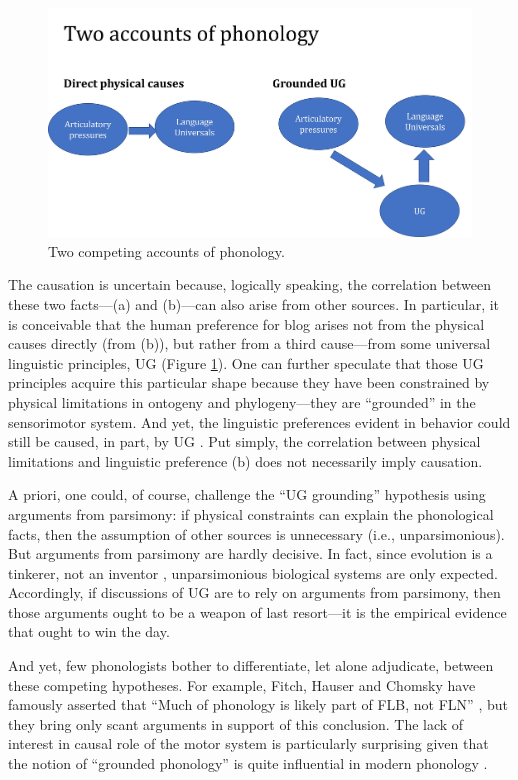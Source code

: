 \documentclass[output=paper,colorlinks,citecolor=brown
]{langscibook}
\begin{document}
\begin{figure}
    \centering
    \includegraphics[width=\textwidth,keepaspectratio]{figures/berent_figure4.jpg}
    \caption{Two competing accounts of phonology.}
    \label{fig:figure4}
\end{figure}
The causation is uncertain because, logically speaking, the correlation between these two facts—(a) and (b)—can also arise from other sources. In particular, it is conceivable that the human preference for blog arises not from the physical causes directly (from (b)), but rather from a third cause—from some universal linguistic principles, UG (Figure \ref{fig:figure4}). One can further speculate that those UG principles acquire this particular shape because they have been constrained by physical limitations in ontogeny and phylogeny—they are “grounded” in the sensorimotor system. And yet, the linguistic preferences evident in behavior could still be caused, in part, by UG \citep{berent2013phonologicala}. Put simply, the correlation between physical limitations and linguistic preference (b) does not necessarily imply causation. 

A priori, one could, of course, challenge the “UG grounding” hypothesis using arguments from parsimony: if physical constraints can explain the phonological facts, then the assumption of other sources is unnecessary (i.e., unparsimonious). But arguments from parsimony are hardly decisive. In fact, since evolution is a tinkerer, not an inventor \citep{jacob1977evolution}, unparsimonious biological systems are only expected. Accordingly, if discussions of UG are to rely on arguments from parsimony, then those arguments ought to be a weapon of last resort—it is the empirical evidence that ought to win the day. 

And yet, few phonologists bother to differentiate, let alone adjudicate, between these competing hypotheses. For example, Fitch, Hauser and Chomsky have famously asserted that “Much of phonology is likely part of FLB, not FLN” \citep{fitch2005evolution}, but they bring only scant arguments in support of this conclusion. The lack of interest in causal role of the motor system is particularly surprising given that the notion of “grounded phonology” is quite influential in modern phonology \citep{archangeli1994grounded,hayes2004phonetically}.
\end{document}

